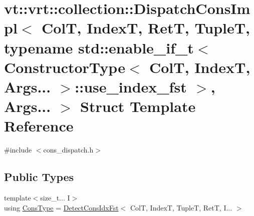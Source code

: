 \hypertarget{structvt_1_1vrt_1_1collection_1_1_dispatch_cons_impl_3_01_col_t_00_01_index_t_00_01_ret_t_00_01_54a52467cad1298e4d5e26941719b8e5}{}\section{vt\+:\+:vrt\+:\+:collection\+:\+:Dispatch\+Cons\+Impl$<$ ColT, IndexT, RetT, TupleT, typename std\+:\+:enable\+\_\+if\+\_\+t$<$ Constructor\+Type$<$ ColT, IndexT, Args... $>$\+:\+:use\+\_\+index\+\_\+fst $>$, Args... $>$ Struct Template Reference}
\label{structvt_1_1vrt_1_1collection_1_1_dispatch_cons_impl_3_01_col_t_00_01_index_t_00_01_ret_t_00_01_54a52467cad1298e4d5e26941719b8e5}


{\ttfamily \#include $<$cons\+\_\+dispatch.\+h$>$}

\subsection*{Public Types}
\begin{DoxyCompactItemize}
\item 
{\footnotesize template$<$size\+\_\+t... I$>$ }\\using \hyperlink{structvt_1_1vrt_1_1collection_1_1_dispatch_cons_impl_3_01_col_t_00_01_index_t_00_01_ret_t_00_01_54a52467cad1298e4d5e26941719b8e5_a8ba35d6a9aa9a28e941196fd9c0d015d}{Cons\+Type} = \hyperlink{structvt_1_1vrt_1_1collection_1_1_detect_cons_idx_fst}{Detect\+Cons\+Idx\+Fst}$<$ ColT, IndexT, TupleT, RetT, I... $>$
\end{DoxyCompactItemize}


